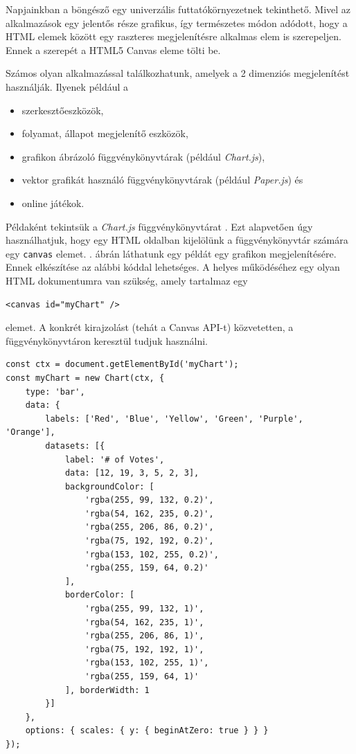 

Napjainkban a böngésző egy univerzális futtatókörnyezetnek tekinthető. Mivel az alkalmazások egy jelentős része grafikus, így természetes módon adódott, hogy a HTML elemek között egy raszteres megjelenítésre alkalmas elem is szerepeljen. Ennek a szerepét a HTML5 Canvas eleme tölti be.

Számos olyan alkalmazással találkozhatunk, amelyek a 2 dimenziós megjelenítést használják. Ilyenek például a
\begin{itemize}
\item szerkesztőeszközök,
\item folyamat, állapot megjelenítő eszközök,
\item grafikon ábrázoló függvénykönyvtárak (például \textit{Chart.js}),
\item vektor grafikát használó függvénykönyvtárak (például \textit{Paper.js}) és
\item online játékok.
\end{itemize}

Példaként tekintsük a \textit{Chart.js} függvénykönyvtárat \cite{da2019learn}.
Ezt alapvetően úgy használhatjuk, hogy egy HTML oldalban kijelölünk a függvénykönyvtár számára egy \texttt{canvas} elemet.
. ábrán láthatunk egy példát egy grafikon megjelenítésére.
Ennek elkészítése az alábbi kóddal lehetséges.
A helyes működéséhez egy olyan HTML dokumentumra van szükség, amely tartalmaz egy
\begin{verbatim}
<canvas id="myChart" />
\end{verbatim}
elemet. A konkrét kirajzolást (tehát a Canvas API-t) közvetetten, a függvénykönyvtáron keresztül tudjuk használni.
\begin{verbatim}
const ctx = document.getElementById('myChart');
const myChart = new Chart(ctx, {
    type: 'bar',
    data: {
        labels: ['Red', 'Blue', 'Yellow', 'Green', 'Purple', 'Orange'],
        datasets: [{
            label: '# of Votes',
            data: [12, 19, 3, 5, 2, 3],
            backgroundColor: [
                'rgba(255, 99, 132, 0.2)',
                'rgba(54, 162, 235, 0.2)',
                'rgba(255, 206, 86, 0.2)',
                'rgba(75, 192, 192, 0.2)',
                'rgba(153, 102, 255, 0.2)',
                'rgba(255, 159, 64, 0.2)'
            ],
            borderColor: [
                'rgba(255, 99, 132, 1)',
                'rgba(54, 162, 235, 1)',
                'rgba(255, 206, 86, 1)',
                'rgba(75, 192, 192, 1)',
                'rgba(153, 102, 255, 1)',
                'rgba(255, 159, 64, 1)'
            ], borderWidth: 1
        }]
    },
    options: { scales: { y: { beginAtZero: true } } }
});
\end{verbatim}

